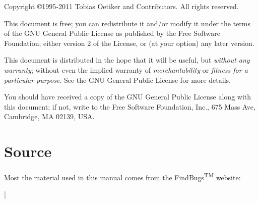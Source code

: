 \begin{small} 
  \noindent Copyright \copyright 1995-2011 Tobias Oetiker and Contributors.  All rights reserved.
 
  This document is free; you can redistribute it and/or modify it
  under the terms of the GNU General Public License as published by
  the Free Software Foundation; either version 2 of the License, or
  (at your option) any later version.
  
  This document is distributed in the hope that it will be useful, but
  \emph{without any warranty}; without even the implied warranty of
  \emph{merchantability} or \emph{fitness for a particular purpose}\@.  See the GNU
  General Public License for more details.
  
  You should have received a copy of the GNU General Public License
  along with this document; if not, write to the Free Software
  Foundation, Inc., 675 Mass Ave, Cambridge, MA 02139, USA.

\end{small}

\chapter{Source}
\noindent Most the material used in this manual comes from
the FindBugs\textsuperscript{\tiny TM} website:
\begin{verse}
%
{}
%
{}
\end{verse}
|

%

